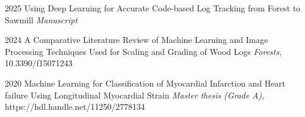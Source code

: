 
\begin{cvSmallExps}
      \cvSmallExp
        {2025} %
        {Using Deep Learning for Accurate Code-based Log Tracking from Forest to Sawmill} %
        {\textit{Manuscript}} %
    
    \cvSmallExp
        {2024} %
        {A Comparative Literature Review of Machine Learning and Image Processing Techniques Used for Scaling and Grading of Wood Logs} %
        {\textit{Forests}, 10.3390/f15071243} %
    
    \cvSmallExp
        {2020} %
        {Machine Learning for Classification of Myocardial Infarction and Heart failure Using Longitudinal Myocardial Strain} %
        {\textit{Master thesis (Grade A)}, https://hdl.handle.net/11250/2778134} %
        
\end{cvSmallExps}